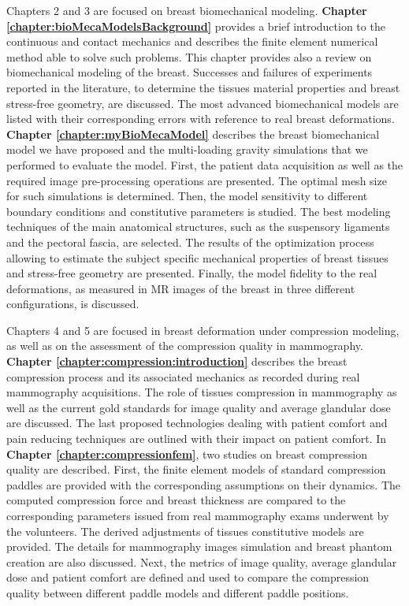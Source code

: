 Chapters 2 and 3 are focused on breast biomechanical modeling. \textbf{Chapter \ref{chapter:bioMecaModelsBackground}} provides a brief introduction to the continuous and contact mechanics and describes the finite element numerical method able to solve such problems.  This chapter provides also a review on biomechanical modeling of the breast. Successes and failures of experiments reported in the literature, to determine the tissues material properties and breast stress-free geometry, are discussed. The most advanced biomechanical models are listed with their corresponding errors with reference to real breast deformations. \textbf{Chapter \ref{chapter:myBioMecaModel}} describes the breast biomechanical model we have proposed and the multi-loading gravity simulations that we performed to evaluate the model. First, the patient data acquisition as well as the required image pre-processing operations are presented. The optimal mesh size for such simulations is determined. Then, the model sensitivity to different boundary conditions and constitutive parameters is studied. The best modeling techniques of the main anatomical structures, such as the suspensory ligaments and the pectoral fascia, are selected. The results of the optimization process allowing to estimate the subject specific mechanical properties of breast tissues and stress-free geometry are presented.
Finally, the model fidelity to the real deformations, as measured in MR images of the breast in three different configurations, is discussed.

Chapters 4 and 5 are focused in breast deformation under compression modeling, as well as on the assessment of the compression quality in mammography. \textbf{Chapter \ref{chapter:compression:introduction}} describes the breast compression process and its associated mechanics as recorded during real mammography acquisitions. The role of tissues compression in mammography as well as the current gold standards for image quality and average glandular dose are discussed. The last proposed technologies dealing with patient comfort and pain reducing techniques are outlined with their impact on patient comfort. In \textbf{Chapter \ref{chapter:compressionfem}}, two studies on breast compression quality are described. First, the finite element models of standard compression paddles are provided with the corresponding assumptions on their dynamics. The computed compression force and breast thickness are compared to the corresponding parameters issued from real mammography exams underwent by the volunteers. The derived adjustments of tissues constitutive models are provided. The details for mammography images simulation and breast phantom creation are also discussed. Next, the metrics of image quality, average glandular dose and patient comfort are defined and used to compare the compression quality between different paddle models and different paddle positions. 
 
